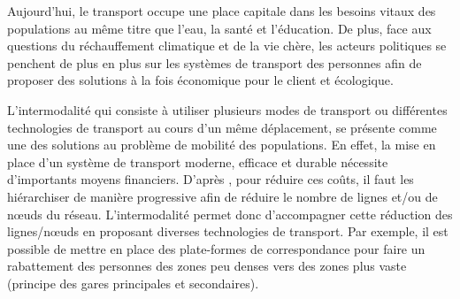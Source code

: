 Aujourd'hui, le transport occupe une place capitale dans les besoins vitaux des populations au même titre que l'eau, la santé et l'éducation. De plus, face aux questions du réchauffement climatique et de la vie chère, les acteurs politiques se penchent de plus en plus sur les systèmes de transport des personnes afin de proposer des solutions à la fois économique pour le client et écologique.

L'intermodalité qui consiste à utiliser plusieurs modes de transport ou différentes technologies de transport au cours d'un même déplacement, se présente comme une des solutions au problème de mobilité des populations. En effet, la mise en place d'un système de transport moderne, efficace et durable nécessite d'importants moyens financiers. D'après \cite{de2000principes}, pour réduire ces coûts, il faut les hiérarchiser de manière progressive afin de réduire le nombre de lignes et/ou de nœuds du réseau. L'intermodalité permet donc d'accompagner cette réduction des lignes/nœuds en proposant diverses technologies de transport. Par exemple, il est possible de mettre en place des plate-formes de correspondance pour faire un rabattement des personnes des zones peu denses vers des zones plus vaste (principe des gares principales et secondaires).
